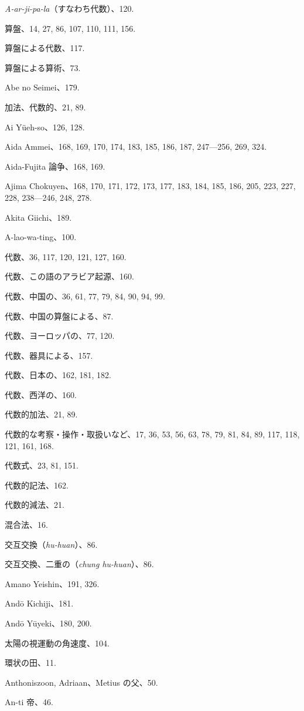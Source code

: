 \documentclass[11pt]{article}
\begin{document}
\emph{A-ar-ji-pa-la}（すなわち代数）、120.\par
算盤、14, 27, 86, 107, 110, 111, 156.\par
算盤による代数、117.\par
算盤による算術、73.\par
Abe no Seimei、179.\par
加法、代数的、21, 89.\par
Ai Yüeh-so、126, 128.\par
Aida Ammei、168, 169, 170, 174, 183, 185, 186, 187, 247---256, 269, 324.\par
Aida-Fujita 論争、168, 169.\par
Ajima Chokuyen、168, 170, 171, 172, 173, 177, 183, 184, 185, 186, 205, 223, 227, 228, 238---246, 248, 278.\par
Akita Giichi、189.\par
A-lao-wa-ting、100.\par
代数、36, 117, 120, 121, 127, 160.\par
代数、この語のアラビア起源、160.\par
代数、中国の、36, 61, 77, 79, 84, 90, 94, 99.\par
代数、中国の算盤による、87.\par
代数、ヨーロッパの、77, 120.\par
代数、器具による、157.\par
代数、日本の、162, 181, 182.\par
代数、西洋の、160.\par
代数的加法、21, 89.\par
代数的な考察・操作・取扱いなど、17, 36, 53, 56, 63, 78, 79, 81, 84, 89, 117, 118, 121, 161, 168.\par
代数式、23, 81, 151.\par
代数的記法、162.\par
代数的減法、21.\par
混合法、16.\par
交互交換（\emph{hu-huan}）、86.\par
交互交換、二重の（\emph{chung hu-huan}）、86.\par
Amano Yeishin、191, 326.\par
Andō Kichiji、181.\par
Andō Yūyeki、180, 200.\par
太陽の視運動の角速度、104.\par
環状の田、11.\par
Anthoniszoon, Adriaan、Metius の父、50.\par
An-ti 帝、46.\par
\end{document}
